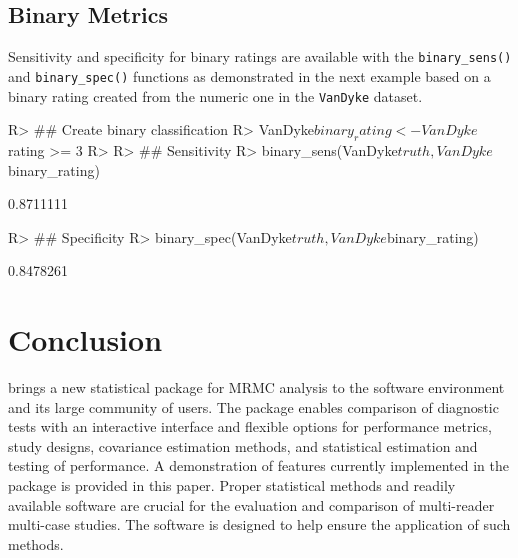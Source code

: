 \documentclass[
]{jss}
\begin{document}
\hypertarget{binary-metrics-1}{%
\subsection{Binary Metrics}\label{binary-metrics-1}}

Sensitivity and specificity for binary ratings are available with the
\texttt{binary\_sens()} and \texttt{binary\_spec()} functions as
demonstrated in the next example based on a binary rating created from
the numeric one in the \texttt{VanDyke} dataset.

\begin{CodeChunk}
\begin{CodeInput}
R> ## Create binary classification
R> VanDyke$binary_rating <- VanDyke$rating >= 3
R> 
R> ## Sensitivity
R> binary_sens(VanDyke$truth, VanDyke$binary_rating)
\end{CodeInput}
\begin{CodeOutput}
[1] 0.8711111
\end{CodeOutput}
\begin{CodeInput}
R> ## Specificity
R> binary_spec(VanDyke$truth, VanDyke$binary_rating)
\end{CodeInput}
\begin{CodeOutput}
[1] 0.8478261
\end{CodeOutput}
\end{CodeChunk}

\hypertarget{conclusion}{%
\section{Conclusion}\label{conclusion}}

 brings a new statistical package for MRMC analysis to the
 software environment and its large community of users. The
package enables comparison of diagnostic tests with an interactive
interface and flexible options for performance metrics, study designs,
covariance estimation methods, and statistical estimation and testing of
performance. A demonstration of features currently implemented in the
package is provided in this paper. Proper statistical methods and
readily available software are crucial for the evaluation and comparison
of multi-reader multi-case studies. The  software is
designed to help ensure the application of such methods.

\renewcommand\refname{References}

\end{document}
